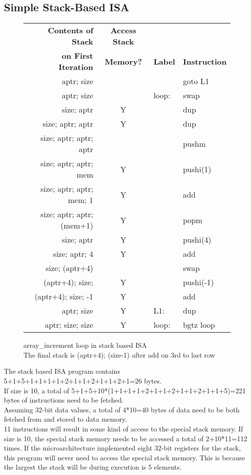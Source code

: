 \documentclass[10pt]{article}
\begin{document}
\subsection{Simple Stack-Based ISA}
\begin{figure}[H]
\centering
\begin{tabular}{rcll}
\hline
\textbf{Contents of Stack}  &  \textbf{Access Stack}\\
\textbf{on First Iteration} &  \textbf{Memory?} & \textbf{Label} & \textbf{Instruction} \\
\hline
aptr; size & & & goto L1\\
aptr; size & & loop: & swap\\
size; aptr & Y & & dup\\
size; aptr; aptr & Y & & dup\\
size; aptr; aptr; aptr  & & & pushm\\
size; aptr; aptr; mem & Y & & pushi(1)\\
size; aptr; aptr; mem; 1 & Y & & add\\
size; aptr; aptr; (mem+1) & Y & & popm\\
size; aptr & Y & & pushi(4)\\
size; aptr; 4 & Y & & add\\
size; (aptr+4) & & & swap\\
(aptr+4); size; & Y & & pushi(-1)\\
(aptr+4); size; -1 & Y & & add\\
aptr; size & Y & L1: & dup\\
aptr; size; size & Y & loop: & bgtz loop\\
\hline
\end{tabular}
\caption{array\_increment loop in stack based ISA
\\The final stack is (aptr+4); (size-1) after add on 3rd to last row}
\label{fig:stack_isa}
\end{figure}
The stack based ISA program contains 5+1+5+1+1+1+1+2+1+1+2+1+1+2+1=26 bytes. \\
If size is 10, a total of 5+1+5+10*(1+1+1+1+2+1+1+2+1+1+2+1+1+5)=221 bytes of instructions need to be fetched. \\
Assuming 32-bit data values, a total of 4*10=40 bytes of data need to be both fetched from and stored to data memory. \\
11 instructions will result in some kind of access to the special stack memory. If size is 10, the special stack memory needs to be accessed a total of 2+10*11=112 times. If the microarchitecture implemented eight 32-bit registers for the stack, this program will never need to access the special stack memory. This is because the largest the stack will be during execution is 5 elements. 
\end{document}
